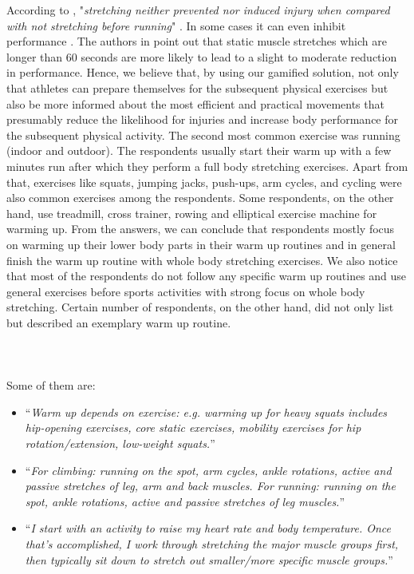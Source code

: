 According to \cite{pereles2012large}, "\textit{stretching neither prevented nor induced injury when compared with not stretching before running}" . In some cases it can even inhibit performance  \cite{kay2012effect}. The authors  in  \cite{kay2012effect} point out that static muscle stretches which are longer than 60 seconds are more likely to lead to a slight to moderate reduction in performance. Hence, we believe that, by using our gamified solution, not only that athletes can prepare themselves for the subsequent physical exercises but also be more informed about the most efficient and practical movements that presumably reduce the likelihood for injuries and increase body performance for the subsequent physical activity. The second most common exercise was running (indoor and outdoor). The respondents usually start their warm up with a few minutes run after which they perform a full body stretching exercises. Apart from that, exercises like squats, jumping jacks, push-ups, arm cycles, and cycling were also common exercises among the respondents. Some respondents, on the other hand, use treadmill, cross trainer, rowing and elliptical exercise machine for warming up. From the answers, we can conclude that respondents mostly focus on warming up their lower body parts in their warm up routines and in general finish the warm up routine with whole body stretching exercises. We also notice that most of the respondents do not follow any specific warm up routines and use general exercises before sports activities with strong focus on whole body stretching. Certain number of respondents, on the other hand, did not only list but described an exemplary warm up routine. \\\\\\\\Some of them are: 
\begin{itemize}
\item ``\textit{Warm up depends on exercise: e.g. warming up for heavy squats includes hip-opening exercises, core static exercises, mobility exercises for hip rotation/extension, low-weight squats.}''
\item ``\textit{For climbing: running on the spot, arm cycles, ankle rotations, active and passive stretches of leg, arm and back muscles.  For running: running on the spot, ankle rotations, active and passive stretches of leg muscles.}''
\item ``\textit{I start with an activity to raise my heart rate and body temperature. Once that's accomplished, I work through stretching the major muscle groups first, then typically sit down to stretch out smaller/more specific muscle groups.}''
\end{itemize}
